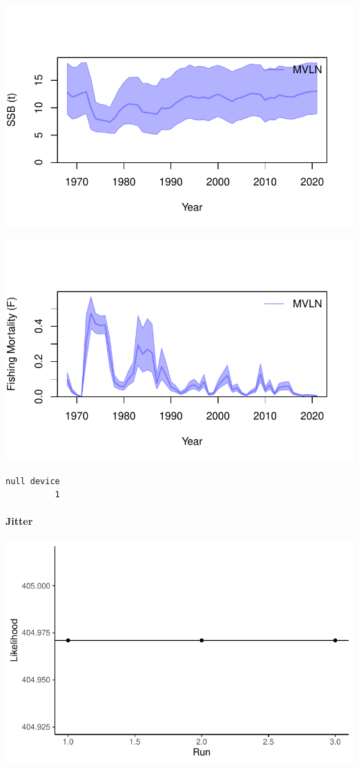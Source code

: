 \documentclass[
  letterpaper,
  DIV=11,
  numbers=noendperiod]{scrartcl}
\let\oldparagraph\paragraph
\renewcommand{\paragraph}[1]{\oldparagraph{#1}\mbox{}}
\begin{document}
\includegraphics{LUKA_50_Base_model_diags_report_files/figure-pdf/mvlnkb-4.pdf}

\includegraphics{LUKA_50_Base_model_diags_report_files/figure-pdf/mvlnkb-5.pdf}

\begin{verbatim}
null device 
          1 
\end{verbatim}

\hypertarget{jitter}{%
\paragraph{Jitter}\label{jitter}}

\includegraphics{LUKA_50_Base_model_diags_report_files/figure-pdf/jitter-1.pdf}
\end{document}
